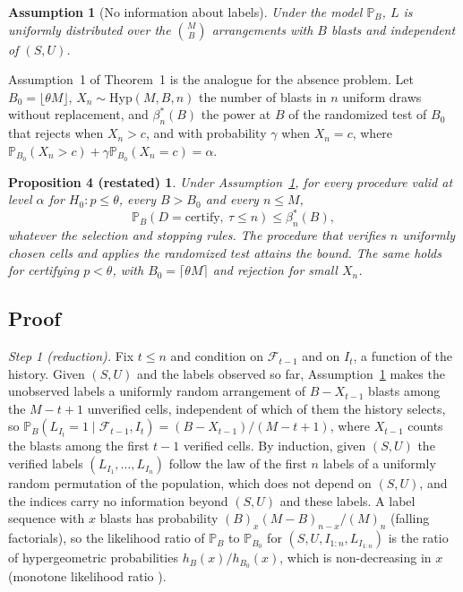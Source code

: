 \documentclass[journal]{IEEEtran}
\newtheorem{assumption}{Assumption}
\newtheorem*{prop4}{Proposition 4 (restated)}
\newcommand{\Prb}{\mathbb{P}}
\begin{document}
\begin{assumption}[No information about labels]\label{as:noinfo}
Under the model $\Prb_B$, $L$ is uniformly distributed over the $\binom MB$ arrangements with $B$ blasts and independent of $(S,U)$.
\end{assumption}
Assumption~1 of Theorem~1 is the analogue for the absence problem. Let $B_0=\lfloor\theta M\rfloor$, $X_n\sim\mathrm{Hyp}(M,B,n)$ the number of blasts in $n$ uniform draws without replacement, and $\beta^*_n(B)$ the power at $B$ of the randomized test of $B_0$ that rejects when $X_n>c$, and with probability $\gamma$ when $X_n=c$, where $\Prb_{B_0}(X_n>c)+\gamma\Prb_{B_0}(X_n=c)=\alpha$.

\begin{prop4}
Under Assumption~\ref{as:noinfo}, for every procedure valid at level $\alpha$ for $H_0:p\le\theta$, every $B>B_0$ and every $n\le M$,
\begin{equation}
\Prb_B(D=\text{certify},\ \tau\le n)\le\beta^*_n(B),\label{eq:limit}
\end{equation}
whatever the selection and stopping rules. The procedure that verifies $n$ uniformly chosen cells and applies the randomized test attains the bound. The same holds for certifying $p<\theta$, with $B_0=\lceil\theta M\rceil$ and rejection for small $X_n$.
\end{prop4}

\subsection{Proof}
\emph{Step 1 (reduction).} Fix $t\le n$ and condition on $\mathcal F_{t-1}$ and on $I_t$, a function of the history. Given $(S,U)$ and the labels observed so far, Assumption~\ref{as:noinfo} makes the unobserved labels a uniformly random arrangement of $B-X_{t-1}$ blasts among the $M-t+1$ unverified cells, independent of which of them the history selects, so $\Prb_B(L_{I_t}=1\mid\mathcal F_{t-1},I_t)=(B-X_{t-1})/(M-t+1)$, where $X_{t-1}$ counts the blasts among the first $t-1$ verified cells. By induction, given $(S,U)$ the verified labels $(L_{I_1},\dots,L_{I_n})$ follow the law of the first $n$ labels of a uniformly random permutation of the population, which does not depend on $(S,U)$, and the indices carry no information beyond $(S,U)$ and these labels. A label sequence with $x$ blasts has probability $(B)_x(M-B)_{n-x}/(M)_n$ (falling factorials), so the likelihood ratio of $\Prb_B$ to $\Prb_{B_0}$ for $(S,U,I_{1:n},L_{I_{1:n}})$ is the ratio of hypergeometric probabilities $h_B(x)/h_{B_0}(x)$, which is non-decreasing in $x$ (monotone likelihood ratio \cite{lehmann2005tsh}).
\end{document}
